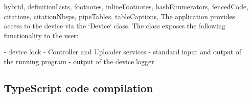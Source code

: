 \begin{markdown*}{%
  hybrid,
  definitionLists,
  footnotes,
  inlineFootnotes,
  hashEnumerators,
  fencedCode,
  citations,
  citationNbsps,
  pipeTables,
  tableCaptions,
}
The application provides access to the device via the `Device` class. The class exposes the following functionality to the user:

  - device lock
  - Controller and Uploader services
  - standard input and output of the running program
  - output of the device logger

\subsection{TypeScript code compilation}


\end{markdown*}